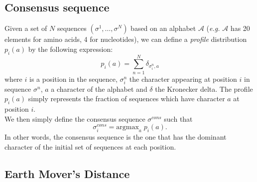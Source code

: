 \documentclass{article}
\begin{document}
\subsection*{Consensus sequence} %
\label{sub:consensus_sequence}
	Given a set of $N$ sequences $(\sigma^1,\ldots,\sigma^N)$ based on an alphabet $\mathcal{A}$ (\emph{e.g.} $\mathcal{A}$ has 20 elements for amino acids, 4 for nucleotides), we can define a \emph{profile} distribution $p_i(a)$ by the following expression:
	$$ p_i(a) = \sum_{n=1}^N \delta_{\sigma^n_i,a} $$ 
	where $i$ is a position in the sequence, $\sigma^n_i$ the character appearing at position $i$ in sequence $\sigma^n$, $a$ a character of the alphabet and $\delta$ the Kronecker delta. The profile $p_i(a)$ simply represents the fraction of sequences which have character $a$ at position $i$. \\
	We then simply define the consensus sequence $\sigma^{cons}$ such that 
	$$\sigma^{cons}_i = \text{argmax}_a \;p_i(a).$$
	In other words, the consensus sequence is the one that has the dominant character of the initial set of sequences at each position.   

\subsection*{Earth Mover's Distance} %
\label{sub:earth_mover_s_distance}
\end{document}

